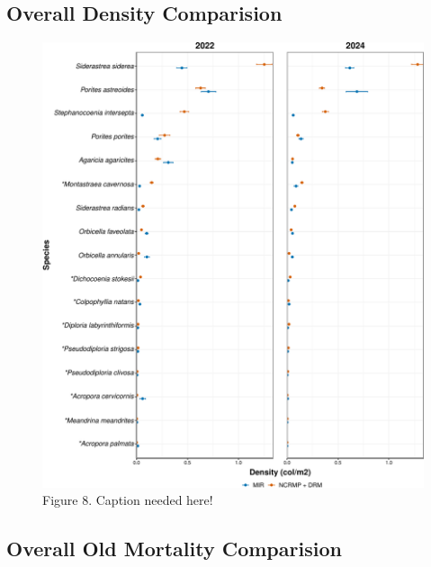 \documentclass[
]{article}
\begin{document}
\hypertarget{overall-density-comparision}{%
\subsection{Overall Density
Comparision}\label{overall-density-comparision}}

\begin{figure}

{\centering \includegraphics{MIR_quarto_files/figure-pdf/overall Density-1.pdf}

}

\caption{Figure 8. Caption needed here!}

\end{figure}

\hypertarget{overall-old-mortality-comparision}{%
\subsection{Overall Old Mortality
Comparision}\label{overall-old-mortality-comparision}}
\end{document}

